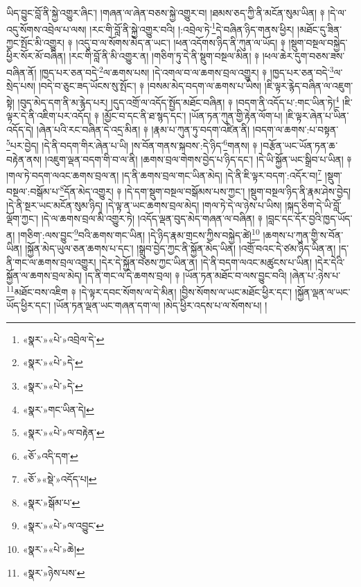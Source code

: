 ཡིད་བྱུང་བློ་ནི་སྐྱེ་འགྱུར་ཞིང་། །གཞན་ལ་ཞེན་བཅས་སྐྱེ་འགྱུར་བ། །ཐམས་ཅད་ཀྱི་ནི་མངོན་སུམ་ཡིན། ༈ །དེ་ལ་འདུ་སོགས་འབྲེལ་པ་ལས། །རང་གི་བློ་ནི་སྐྱེ་འགྱུར་བའི། །:འབྲེལ་ཏེ་\footnote{«སྣར་»«པེ་»འབྲེལ་དེ་}དེ་བཞིན་ཉིད་གནས་ཕྱིར། །མཐོང་དུ་ཟིན་ཀྱང་སྤོང་མི་འགྱུར། ༈ །འདུ་བ་ལ་སོགས་མེད་ན་ཡང་། །ཕན་འདོགས་ཉིད་ནི་ཀུན་ལ་ཡོད། ༈ །སྡུག་བསྔལ་བསྐྱེད་ཕྱིར་སོར་མོ་བཞིན། །རང་གི་བློ་ནི་མི་འགྱུར་ན། །གཅིག་ཏུ་དེ་ནི་སྡུག་བསྔལ་མིན། ༈ །ཕལ་ཆེར་དུག་བཅས་ཟས་བཞིན་ནོ། །ཁྱད་པར་ཅན་བདེ་\footnote{«སྣར་»«པེ་»དེ་}ལ་ཆགས་པས། །དེ་འགལ་བ་ལ་ཆགས་བྲལ་འགྱུར། ༈ །ཁྱད་པར་ཅན་བདེ་\footnote{«སྣར་»«པེ་»དེ་}ལ་སྲེད་པས། །བདེ་བ་ཅུང་ཟད་ཡོངས་སུ་སྤོང་། ༈ །བསམ་མེད་བདག་ལ་ཆགས་པ་ཡིས། །ཇི་ལྟར་རྙེད་བཞིན་ལ་འཇུག་སྟེ། །བུད་མེད་དག་ནི་མ་རྙེད་པར། །དུད་འགྲོ་ལ་འདོད་སྤྱོད་མཐོང་བཞིན། ༈ །བདག་ནི་འདོད་པ་:གང་ཡིན་ཏེ།\footnote{«སྣར་»གང་ཡིན་དེ།} །ཇི་ལྟར་དེ་ནི་འཇིག་པར་འདོད། ༈ །མྱོང་བ་དང་ནི་ཐ་སྙད་དང་། །ཡོན་ཏན་ཀུན་གྱི་རྟེན་ལོག་པ། །ཇི་ལྟར་ཞེན་པ་ཡིན་འདོད་དེ། །ཞེན་པའི་རང་བཞིན་དེ་འདྲ་མིན། ༈ །རྣམ་པ་ཀུན་ཏུ་བདག་འཛིན་ནི། །བདག་ལ་ཆགས་:པ་བསྟན་\footnote{«སྣར་»«པེ་»ལ་བརྟེན་}པར་བྱེད། །དེ་ནི་བདག་གིར་ཞེན་པ་ཡི། །ས་བོན་གནས་སྐབས་:དེ་ཉིད་\footnote{«ཅོ་»འདི་དག་}གནས། ༈ །བརྩོན་ཡང་ཡོན་ཏན་ཆ་བརྟེན་ནས། །འཇུག་ལྡན་བདག་གི་བ་ལ་ནི། །ཆགས་བྲལ་གེགས་བྱེད་པ་ཉིད་དང་། །དེ་ཡི་སྐྱོན་ཡང་སྒྲིབ་པ་ཡིན། ༈ །གལ་ཏེ་བདག་ལའང་ཆགས་བྲལ་ན། །ད་ནི་ཆགས་བྲལ་གང་ཡིན་མེད། །དེ་ནི་ཇི་ལྟར་བདག་:འདོར་བ།\footnote{«ཅོ་»«སྡེ་»འདོད་པ།} །སྡུག་བསྔལ་:བསྒོམ་པ་\footnote{«སྣར་»སྒོམ་པ་}དོན་མེད་འགྱུར། ༈ །དེ་དག་སྡུག་བསྔལ་བསྒོམས་པས་ཀྱང་། །སྡུག་བསྔལ་ཉིད་ནི་རྣམ་ཤེས་བྱེད། །དེ་ནི་སྔར་ཡང་མངོན་སུམ་ཉིད། །དེ་ལྟ་ན་ཡང་ཆགས་བྲལ་མེད། །གལ་ཏེ་དེ་ལ་ཉེས་པ་ཡིས། །སྐད་ཅིག་དེ་ཡི་བློ་ལྡོག་ཀྱང་། །དེ་ལ་ཆགས་བྲལ་མི་འགྱུར་ཏེ། །འདོད་ལྡན་བུད་མེད་གཞན་ལ་བཞིན། ༈ །བླང་དང་དོར་བྱའི་ཁྱད་ཡོད་ན། །གཅིག་:ལས་བྱུང་\footnote{«སྣར་»«པེ་»ལ་འབྱུང་}བའི་ཆགས་གང་ཡིན། །དེ་ཉིད་རྣམ་གྲངས་ཀྱིས་བསྐྱེད་ཚེ།\footnote{«སྣར་»«པེ་»ཆེ།} །ཆགས་པ་ཀུན་གྱི་ས་བོན་ཡིན། །སྐྱོན་མེད་ཡུལ་ཅན་ཆགས་པ་དང་། །སྒྲུབ་བྱེད་ཀྱང་ནི་སྐྱོན་མེད་ཡིན། །འགྲོ་བའང་དེ་ཙམ་ཉིད་ཡིན་ན། །ད་ནི་གང་ལ་ཆགས་བྲལ་འགྱུར། །དེར་དེ་སྐྱོན་བཅས་ཀྱང་ཡིན་ན། །དེ་ནི་བདག་ལའང་མཚུངས་པ་ཡིན། །དེར་དེའི་སྐྱོན་ལ་ཆགས་བྲལ་མེད། །ད་ནི་གང་ལ་དེ་ཆགས་བྲལ། ༈ །ཡོན་ཏན་མཐོང་བ་ལས་བྱུང་བའི། །ཞེན་པ་:ཉེས་པ་\footnote{«སྣར་»ཉེས་པས་}མཐོང་བས་འཇིག ༈ །དེ་ལྟར་དབང་སོགས་ལ་དེ་མིན། །བྱིས་སོགས་ལ་ཡང་མཐོང་ཕྱིར་དང་། །སྐྱོན་ལྡན་ལ་ཡང་ཡོད་ཕྱིར་དང་། །ཡོན་ཏན་ལྡན་ཡང་གཞན་དག་ལ། །མེད་ཕྱིར་འདས་པ་ལ་སོགས་པ། །
